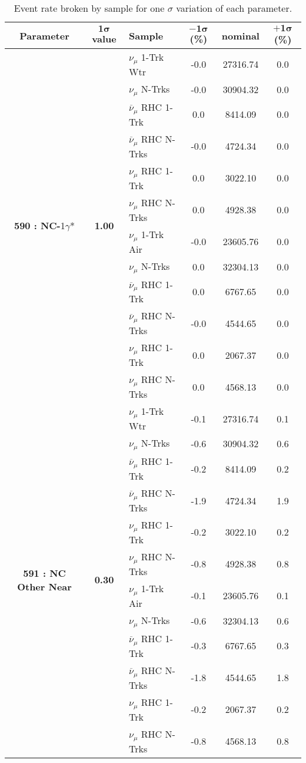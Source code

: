 \begin{table}[ht!]
\centering
\begin{tabular}{ c  c  l  c  c  c }
\midrule[1.3pt]
\textbf{Parameter} & \textbf{$\mathbf{1\sigma}$ value} & \textbf{Sample} & \textbf{$\mathbf{-1\sigma}$ (\%)}  &  \textbf{nominal}  &  \textbf{$\mathbf{+1\sigma}$ (\%)} \\
\midrule[1.3pt]
\multirow{12}{*}{\textbf{590 : NC-}1$\gamma$*}& \multirow{12}{*}{\textbf{1.00}} & $\nu_\mu$ 1-Trk Wtr &   -0.0 &  27316.74 &   0.0 \\ 
 &  & $\nu_\mu$ N-Trks &   -0.0 &  30904.32 &   0.0 \\ 
 &  & $\overline{\nu}_\mu$ RHC 1-Trk &   0.0 &  8414.09 &   0.0 \\ 
 &  & $\overline{\nu}_\mu$ RHC N-Trks &   -0.0 &  4724.34 &   0.0 \\ 
 &  & $\nu_\mu$ RHC 1-Trk &   0.0 &  3022.10 &   0.0 \\ 
 &  & $\nu_\mu$ RHC N-Trks &   0.0 &  4928.38 &   0.0 \\ 
 &  & $\nu_\mu$ 1-Trk Air &   -0.0 &  23605.76 &   0.0 \\ 
 &  & $\nu_\mu$ N-Trks &   0.0 &  32304.13 &   0.0 \\ 
 &  & $\overline{\nu}_\mu$ RHC 1-Trk &   0.0 &  6767.65 &   0.0 \\ 
 &  & $\overline{\nu}_\mu$ RHC N-Trks &   -0.0 &  4544.65 &   0.0 \\ 
 &  & $\nu_\mu$ RHC 1-Trk &   0.0 &  2067.37 &   0.0 \\ 
 &  & $\nu_\mu$ RHC N-Trks &   0.0 &  4568.13 &   0.0 \\ 
\midrule[1.3pt]
\multirow{12}{*}{\textbf{591 : NC Other Near}} & \multirow{12}{*}{\textbf{0.30}} & $\nu_\mu$ 1-Trk Wtr &   -0.1 &  27316.74 &   0.1 \\ 
 &  & $\nu_\mu$ N-Trks &   -0.6 &  30904.32 &   0.6 \\ 
 &  & $\overline{\nu}_\mu$ RHC 1-Trk &   -0.2 &  8414.09 &   0.2 \\ 
 &  & $\overline{\nu}_\mu$ RHC N-Trks &   -1.9 &  4724.34 &   1.9 \\ 
 &  & $\nu_\mu$ RHC 1-Trk &   -0.2 &  3022.10 &   0.2 \\ 
 &  & $\nu_\mu$ RHC N-Trks &   -0.8 &  4928.38 &   0.8 \\ 
 &  & $\nu_\mu$ 1-Trk Air &   -0.1 &  23605.76 &   0.1 \\ 
 &  & $\nu_\mu$ N-Trks &   -0.6 &  32304.13 &   0.6 \\ 
 &  & $\overline{\nu}_\mu$ RHC 1-Trk &   -0.3 &  6767.65 &   0.3 \\ 
 &  & $\overline{\nu}_\mu$ RHC N-Trks &   -1.8 &  4544.65 &   1.8 \\ 
 &  & $\nu_\mu$ RHC 1-Trk &   -0.2 &  2067.37 &   0.2 \\ 
 &  & $\nu_\mu$ RHC N-Trks &   -0.8 &  4568.13 &   0.8 \\ 
\midrule[1.3pt]
\end{tabular}
\centering
\caption{Event rate broken by sample for one $\sigma$ variation of each parameter.}
\end{table}
\addtocounter{table}{-1}

